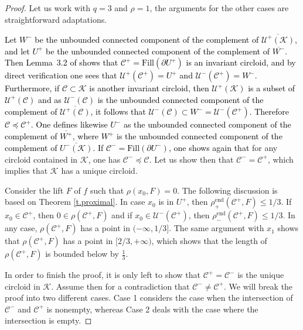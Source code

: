 \documentclass[12pt,a4paper]{amsart}
\theoremstyle{definition}
\theoremstyle{remark}
\begin{document}
\begin{proof}
Let us work with  $q=3$ and $\rho=1$, the arguments for the other cases are straightforward adaptations. 

\textcolor{black}{Let $W^{-}$ be the unbounded connected component of the complement of $\overline{\mathcal{U}^{+}(\mathcal{K})}$, and let $U^{+}$ be the unbounded connected component of the complement of $\overline{W^{-}}$. Then Lemma~3.2 of \cite{jager} shows that $\mathcal{C}^{+}=\mathrm{Fill}(\partial U^{+})$ is an invariant circloid, and by direct verification one sees that $\mathcal{U}^{+}(\mathcal{C}^{+})=U^{+}$ and $\mathcal{U}^{-}(\mathcal{C}^{+})=W^{-}$. Furthermore, if $\mathcal{C}\subset\mathcal{K}$ is another invariant circloid, then $\mathcal{U}^{+}(\mathcal{K})$ is a subset of $\mathcal{U}^{+}(\mathcal{C})$ and as $\mathcal{U}^{-}(\mathcal{C})$ is the unbounded connected component of the complement of $\overline{\mathcal{U}^{+}(\mathcal{C})}$, it follows that $\mathcal{U}^{-}(\mathcal{C})\subset W^{-}=\mathcal{U}^{-}(\mathcal{C}^{+})$. Therefore $\mathcal{C}\preccurlyeq\mathcal{C}^{+}$. One defines likewise $U^{-}$ as the unbounded connected component of the complement of $\overline{W^{+}}$, where $W^{+}$ is the unbounded connected component of the complement of $\overline{U^{-}(\mathcal{K})}$. If $\mathcal{C}^{-}=\mathrm{Fill}(\partial U^{-})$, one shows again that }for any circloid contained in $\mathcal{K}$, one has $\mathcal{C}^{-}\preccurlyeq\mathcal{C}$. Let us show then that $\mathcal{C}^{-}=\mathcal{C}^{+}$, which implies that $\mathcal{K}$ has a unique circloid.


Consider the lift $F$ of $f$ such that $\rho(x_0,F)=0$. The following discussion is based on Theorem \ref{t.proximal}.
In case $x_0$ is in $U^{+}$, then $\rho^{\mathrm{end}}_{+}(\mathcal{C}^{+},F)\le 1/3$. If $x_0\in \mathcal{C}^{+}$, then $0\in\rho(\mathcal{C}^{+},F)$ and if $x_0\in\mathcal{U}^{-}(\mathcal{C}^{+})$, then  $\rho^{\mathrm{end}}_{-}(\mathcal{C}^{+},F)\le 1/3$. In any case, $\rho(\mathcal{C}^{+},F)$ has a point in $(-\infty, 1/3]$. The same argument with $x_1$ shows that $\rho(\mathcal{C}^{+},F)$ has a point in $[2/3, +\infty)$, which shows that the length of $\rho(\mathcal{C}^+,F)$ is bounded below by $\frac{1}{3}$.

In order to finish the proof, it is only left to show that $\mathcal{C}^{+}=\mathcal{C}^{-}$ is the unique circloid in 
$\mathcal{K}$. Assume then for a contradiction that $\mathcal{C}^{-}\not=\mathcal{C}^{+}$. We will break the proof into two different cases. Case 1 considers the case when the intersection of $\mathcal{C}^-$ and $\mathcal{C}^+$ is nonempty, whereas Case 2 deals with the case where the intersection is empty.


\end{proof}
\end{document}
